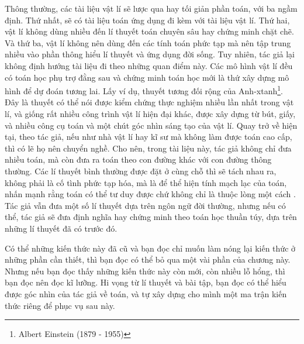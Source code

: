 Thông thường, các tài liệu vật lí sẽ lược qua hay tối giản phần toán, với ba ngầm định. Thứ nhất, sẽ có tài liệu toán ứng dụng đi kèm với tài liệu vật lí. Thứ hai, vật lí không dùng nhiều đến lí thuyết toán chuyên sâu hay chứng minh chặt chẽ. Và thứ ba, vật lí không nên dùng đến các tính toán phức tạp mà nên tập trung nhiều vào phần thông hiểu lí thuyết và ứng dụng đời sống. Tuy nhiên, tác giả lại không định hướng tài liệu đi theo những quan điểm này. Các mô hình vật lí đều có toán học phụ trợ đằng sau và chứng minh toán học mới là thứ xây dựng mô hình để dự đoán tương lai. Lấy ví dụ, thuyết tương đối rộng của Anh-xtanh\footnote{Albert Einstein (1879 - 1955)}. Đây là thuyết có thể nói được kiểm chứng thực nghiệm nhiều lần nhất trong vật lí, và giống rất nhiều công trình vật lí hiện đại khác, được xây dựng từ bút, giấy, và nhiều công cụ toán và một chút góc nhìn sáng tạo của vật lí. Quay trở về hiện tại, theo tác giả, nếu như nhà vật lí hay kĩ sư mà không làm được toán cao cấp, thì có lẽ họ nên chuyển nghề. Cho nên, trong tài liệu này, tác giả không chỉ đưa nhiều toán, mà còn đưa ra toán theo con đường khác với con đường thông thường. Các lí thuyết bình thường được đặt ở cùng chỗ thì sẽ tách nhau ra, không phải là cố tình phức tạp hóa, mà là để thể hiện tính mạch lạc của toán, nhấn mạnh rằng toán có thể tư duy được chứ không chỉ là thuộc lòng một cách . Tác giả vẫn đưa một số lí thuyết dựa trên ngôn ngữ đời thường, nhưng nếu có thể, tác giả sẽ đưa định nghĩa hay chứng minh theo toán học thuần túy, dựa trên những lí thuyết đã có trước đó.

Có thể những kiến thức này đã cũ và bạn đọc chỉ muốn làm nóng lại kiến thức ở những phần cần thiết, thì bạn đọc có thể bỏ qua một vài phần của chương này. Nhưng nếu bạn đọc thấy những kiến thức này còn mới, còn nhiều lỗ hổng, thì bạn đọc nên đọc kĩ lưỡng. Hi vọng từ lí thuyết và bài tập, bạn đọc có thể hiểu được góc nhìn của tác giả về toán, và tự xây dựng cho mình một ma trận kiến thức riêng để phục vụ sau này.

% 

% 
% 
